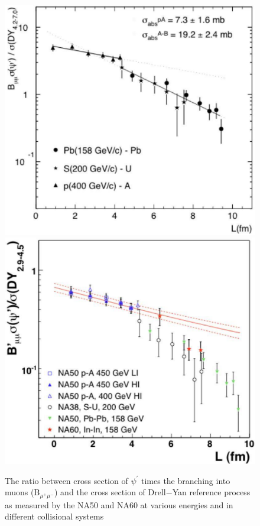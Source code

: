\begin{figure}
  \includegraphics[width=\smallfigwidth]{chap_QuarkoniaSurvey_figures/SPS_Psi_218_1}
  \includegraphics[width=\smallfigwidth]{chap_QuarkoniaSurvey_figures/SPS_Psi_218_2}
  \caption[PsiNA50NA60]{The ratio between cross section of $\psi^{'}$ times the branching into
    muons (B$_{\mu^{+}\mu^{-}}$) and the cross section of Drell$-$Yan reference process as measured
    by the NA50 and NA60 at various energies and in different collisional systems}
  \label{fig:PsiAtSPSNA50NA60}
\end{figure}


